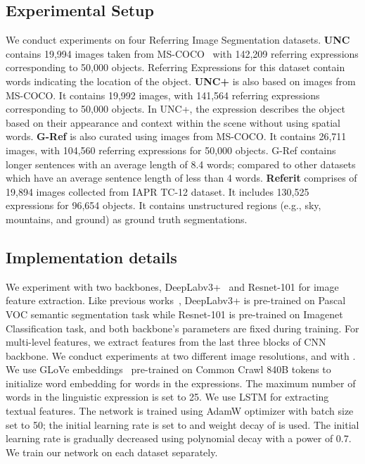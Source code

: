 \documentclass[11pt]{article}
\begin{document}
\subsection{Experimental Setup}
We conduct experiments on four Referring Image Segmentation datasets. \textbf{UNC} \cite{yu2016modeling} contains 19,994 images taken from MS-COCO~\cite{Lin2014MicrosoftCC} with 142,209 referring expressions corresponding to 50,000 objects. Referring Expressions for this dataset contain words indicating the location of the object. \textbf{UNC+} \cite{yu2016modeling} is also based on images from MS-COCO. It contains 19,992 images, with 141,564 referring expressions corresponding to 50,000 objects. In UNC+, the expression describes the object based on their appearance and context within the scene without using spatial words. \textbf{G-Ref} \cite{mao2016generation} is also curated using images from MS-COCO. It contains 26,711 images, with 104,560 referring expressions for 50,000 objects. G-Ref contains longer sentences with an average length of 8.4 words; compared to other datasets which have an average sentence length of less than 4 words. \textbf{Referit} \cite{KazemzadehOrdonezMattenBergEMNLP14} comprises of 19,894 images collected from IAPR TC-12 dataset. It includes 130,525 expressions for 96,654 objects. It contains unstructured regions (e.g., sky, mountains, and ground) as ground truth segmentations.



\subsection{Implementation details}

We experiment with two backbones, DeepLabv3+~\cite{chen2018encoderdecoder} and Resnet-101 for image feature extraction. Like previous works~\cite{ye2019cross, Chen_2019_ICCV, Hu_2020_CVPR}, DeepLabv3+ is pre-trained on Pascal VOC semantic segmentation task while Resnet-101 is pre-trained on Imagenet Classification task, and both backbone's parameters are fixed during training. For multi-level features, we extract features from the last three blocks of CNN backbone. We conduct experiments at two different image resolutions,  and  with . We use GLoVe embeddings~\cite{Pennington14glove:global} pre-trained on Common Crawl 840B tokens to initialize word embedding for words in the expressions. The maximum number of words in the linguistic expression is set to 25. We use LSTM for extracting textual features. The network is trained using AdamW optimizer with batch size set to 50; the initial learning rate is set to  and weight decay of  is used. The initial learning rate is gradually decreased using polynomial decay with a power of 0.7. We train our network on each dataset separately. 
\end{document}
